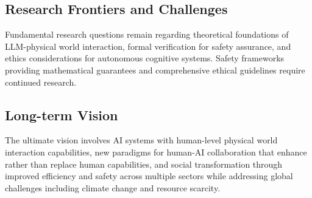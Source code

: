 \subsection{Research Frontiers and Challenges}

Fundamental research questions remain regarding theoretical foundations of LLM-physical world interaction, formal verification for safety assurance, and ethics considerations for autonomous cognitive systems. Safety frameworks providing mathematical guarantees and comprehensive ethical guidelines require continued research.

\subsection{Long-term Vision}

The ultimate vision involves AI systems with human-level physical world interaction capabilities, new paradigms for human-AI collaboration that enhance rather than replace human capabilities, and social transformation through improved efficiency and safety across multiple sectors while addressing global challenges including climate change and resource scarcity. 